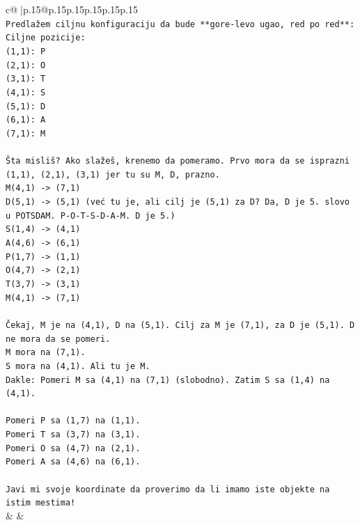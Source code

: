 \documentclass{article}
\begin{document}
{\begin{supertabular}{c@{$\;$}|p{.15\linewidth}@{}p{.15\linewidth}p{.15\linewidth}p{.15\linewidth}p{.15\linewidth}p{.15\linewidth}}
{{{\\ 
\texttt{Predlažem ciljnu konfiguraciju da bude **gore{-}levo ugao, red po red**:} \\
\texttt{Ciljne pozicije:} \\
\texttt{(1,1): P} \\
\texttt{(2,1): O} \\
\texttt{(3,1): T} \\
\texttt{(4,1): S} \\
\texttt{(5,1): D} \\
\texttt{(6,1): A} \\
\texttt{(7,1): M} \\
\\ 
\texttt{Šta misliš? Ako slažeš, krenemo da pomeramo. Prvo mora da se isprazni (1,1), (2,1), (3,1) jer tu su M, D, prazno.} \\
\texttt{M(4,1) {-}> (7,1)} \\
\texttt{D(5,1) {-}> (5,1) (već tu je, ali cilj je (5,1) za D? Da, D je 5. slovo u POTSDAM. P{-}O{-}T{-}S{-}D{-}A{-}M. D je 5.)} \\
\texttt{S(1,4) {-}> (4,1)} \\
\texttt{A(4,6) {-}> (6,1)} \\
\texttt{P(1,7) {-}> (1,1)} \\
\texttt{O(4,7) {-}> (2,1)} \\
\texttt{T(3,7) {-}> (3,1)} \\
\texttt{M(4,1) {-}> (7,1)} \\
\\ 
\texttt{Čekaj, M je na (4,1), D na (5,1). Cilj za M je (7,1), za D je (5,1). D ne mora da se pomeri.} \\
\texttt{M mora na (7,1).} \\
\texttt{S mora na (4,1). Ali tu je M.} \\
\texttt{Dakle: Pomeri M sa (4,1) na (7,1) (slobodno). Zatim S sa (1,4) na (4,1).} \\
\\ 
\texttt{Pomeri P sa (1,7) na (1,1).} \\
\texttt{Pomeri T sa (3,7) na (3,1).} \\
\texttt{Pomeri O sa (4,7) na (2,1).} \\
\texttt{Pomeri A sa (4,6) na (6,1).} \\
\\ 
\texttt{Javi mi svoje koordinate da proverimo da li imamo iste objekte na istim mestima!} \\
            }
        }
    }
    & & \\ \\


\end{supertabular}}
\end{document}
